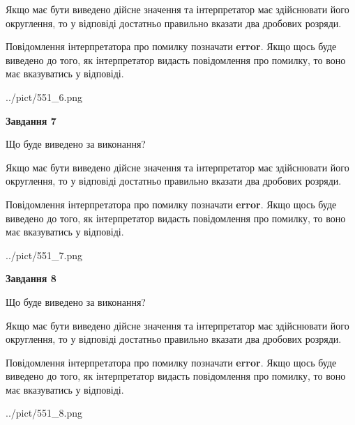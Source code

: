 \documentclass[12pt, ukrainian]{article}
\begin{document}
{\begin {Large}
Якщо має бути виведено дійсне значення та інтерпретатор має здійснювати його округлення, 
то у відповіді достатньо правильно вказати два дробових розряди.

Повідомлення інтерпретатора про помилку позначати \textbf{error}.
Якщо щось буде виведено до того, як інтерпретатор видасть повідомлення про помилку, 
то воно має вказуватись у відповіді. \par

\begin{center}
	{../pict/551_6.png}
\end{center}
\newpage

{\begin {center}\textbf{Завдання 7}\end {center}}\par
Що буде виведено за виконання? \par

Якщо має бути виведено дійсне значення та інтерпретатор має здійснювати його округлення, 
то у відповіді достатньо правильно вказати два дробових розряди.

Повідомлення інтерпретатора про помилку позначати \textbf{error}.
Якщо щось буде виведено до того, як інтерпретатор видасть повідомлення про помилку, 
то воно має вказуватись у відповіді. \par

\begin{center}
	{../pict/551_7.png}
\end{center}
\newpage

{\begin {center}\textbf{Завдання 8}\end {center}}\par
Що буде виведено за виконання? \par

Якщо має бути виведено дійсне значення та інтерпретатор має здійснювати його округлення, 
то у відповіді достатньо правильно вказати два дробових розряди.

Повідомлення інтерпретатора про помилку позначати \textbf{error}.
Якщо щось буде виведено до того, як інтерпретатор видасть повідомлення про помилку, 
то воно має вказуватись у відповіді. \par

\begin{center}
	{../pict/551_8.png}
\end{center}
\newpage


\end{Large}}
\end{document}
